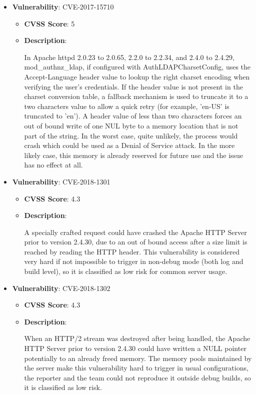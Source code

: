 \documentclass{article}
\begin{document}
\begin{itemize}
        \item \textbf{Vulnerability}: CVE-2017-15710
        \begin{itemize}
            \item \textbf{CVSS Score}:  5 
            \item \textbf{Description}:
            \parbox[t]{0.9\linewidth}{
                \ttfamily In Apache httpd 2.0.23 to 2.0.65, 2.2.0 to 2.2.34, and 2.4.0 to 2.4.29, mod\_authnz\_ldap, if configured with AuthLDAPCharsetConfig, uses the Accept-Language header value to lookup the right charset encoding when verifying the user's credentials. If the header value is not present in the charset conversion table, a fallback mechanism is used to truncate it to a two characters value to allow a quick retry (for example, 'en-US' is truncated to 'en'). A header value of less than two characters forces an out of bound write of one NUL byte to a memory location that is not part of the string. In the worst case, quite unlikely, the process would crash which could be used as a Denial of Service attack. In the more likely case, this memory is already reserved for future use and the issue has no effect at all.
            }
        \end{itemize}
    
        \item \textbf{Vulnerability}: CVE-2018-1301
        \begin{itemize}
            \item \textbf{CVSS Score}:  4.3 
            \item \textbf{Description}:
            \parbox[t]{0.9\linewidth}{
                \ttfamily A specially crafted request could have crashed the Apache HTTP Server prior to version 2.4.30, due to an out of bound access after a size limit is reached by reading the HTTP header. This vulnerability is considered very hard if not impossible to trigger in non-debug mode (both log and build level), so it is classified as low risk for common server usage.
            }
        \end{itemize}
    
        \item \textbf{Vulnerability}: CVE-2018-1302
        \begin{itemize}
            \item \textbf{CVSS Score}:  4.3 
            \item \textbf{Description}:
            \parbox[t]{0.9\linewidth}{
                \ttfamily When an HTTP/2 stream was destroyed after being handled, the Apache HTTP Server prior to version 2.4.30 could have written a NULL pointer potentially to an already freed memory. The memory pools maintained by the server make this vulnerability hard to trigger in usual configurations, the reporter and the team could not reproduce it outside debug builds, so it is classified as low risk.
            }
        \end{itemize}
    

\end{itemize}
\end{document}
